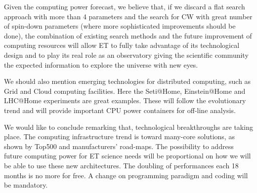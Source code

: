 Given the computing power forecast, we believe that, if we discard a flat 
search approach with more than 4 parameters and the  search for CW with great 
number of spin-down parameters (where more sophisticated improvements should be 
done), the combination of  existing search methods and the future improvement 
of computing resources will allow  ET to fully  take advantage of its 
technological design and to play its real role as an observatory giving the 
scientific community the expected information to explore the universe with new 
eyes.

We should also mention emerging technologies for distributed computing, such 
as Grid and Cloud computing facilities. Here the Seti@Home, Einstein@Home and LHC@Home
experiments are great examples. These will follow the evolutionary trend and 
will provide important CPU power containers for off-line analysis.

We would like to conclude remarking that, technological breakthroughs are 
taking place. The computing infrastructure trend is toward many-core solutions, 
as shown by Top500 and manufacturers' road-maps. The possibility to address 
future computing power for ET science needs will be proportional on how we will 
be able to use these new architectures. The doubling of performances each 18 
months is no more for free. A change on programming paradigm and coding will be 
mandatory.


\FloatBarrier
